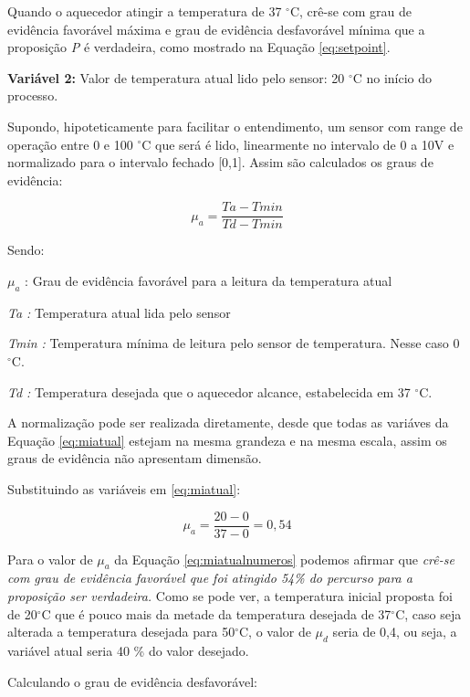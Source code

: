 Quando o aquecedor atingir a temperatura de 37 $^{\circ}$C, 
crê-se com grau de evidência favorável máxima e grau de evidência desfavorável mínima que a proposição \emph{P} é verdadeira, como mostrado na Equação \ref{eq:setpoint}.



\textbf{Variável 2:} 
Valor de temperatura atual lido pelo sensor: 20 $^{\circ}$C no início do processo.

Supondo, hipoteticamente para facilitar o entendimento, um sensor com range de operação entre 0 e 100 $^{\circ}$C que será é lido, linearmente no intervalo de 0 a 10V e normalizado para o intervalo fechado [0,1]. Assim são calculados os graus de evidência:

\begin{equation}
\mu _{a} = 
\frac{Ta - Tmin}{Td - Tmin}
\label{eq:miatual}
\end{equation}

Sendo:

$\mu _{a}$ : Grau de evidência favorável para a leitura da temperatura atual

\emph{Ta :} Temperatura atual lida pelo sensor

\emph{Tmin :} Temperatura mínima de leitura pelo sensor de temperatura. Nesse caso 0 $^{\circ}$C.

\emph{Td :} Temperatura desejada que o aquecedor alcance, estabelecida em 37 $^{\circ}$C.

A normalização pode ser realizada diretamente, desde que todas as variáves da Equação \ref{eq:miatual} estejam na mesma grandeza e na mesma escala, assim os graus de evidência não apresentam dimensão.

Substituindo as variáveis em \ref{eq:miatual}:

\begin{equation}
\mu _{a} = 
\frac{20 - 0}{37 - 0} = 0,54
\label{eq:miatualnumeros}
\end{equation}

Para o valor de $\mu _{a}$ da Equação \ref{eq:miatualnumeros} podemos afirmar que \emph{crê-se com grau de evidência favorável que foi atingido 54\% do percurso para a proposição ser verdadeira.} Como se pode ver, a temperatura inicial proposta foi de 20$^{\circ}$C que é pouco mais da metade da temperatura desejada de 37$^{\circ}$C, caso seja alterada a temperatura desejada para 50$^{\circ}$C, o valor de $\mu _{d}$ seria de 0,4, ou seja, a variável atual seria 40 \% do valor desejado. 

Calculando o grau de evidência desfavorável:

